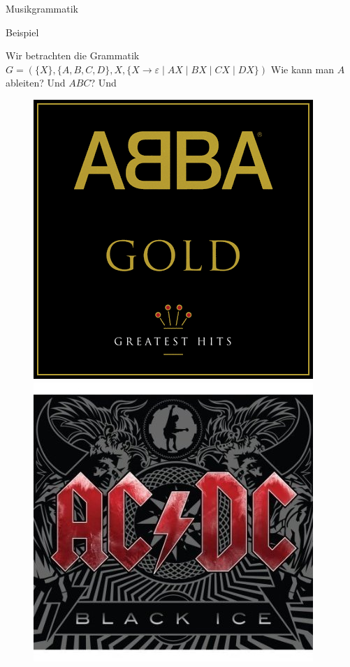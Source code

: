 \begin{frame}{Musikgrammatik}
\begin{exampleblock}{Beispiel}
	
	Wir betrachten die Grammatik $G = (\{X\}, \{A, B, C, D\}, X, \{X \to \varepsilon \mid AX \mid BX \mid CX \mid DX\})$
		Wie kann man $A$ ableiten? Und $ABC$? \pause Und
		\begin{figure}[h!]
			\centering
			\includegraphics[scale=0.2]{../figures/ABBA_Gold_cover.png} \hspace{2em} \pause
			\includegraphics[scale=0.2]{../figures/acdc-black-ice.jpg} \hspace{2em} \pause

\end{figure}
\end{exampleblock}
\end{frame}
